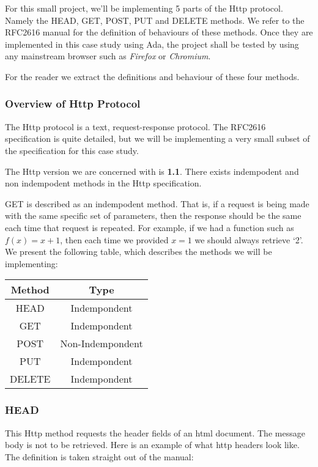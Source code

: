 For this small project, we'll be implementing 5 parts of the Http protocol. 
Namely the HEAD, GET, POST, PUT and DELETE methods. We refer to the RFC2616 manual \cite{RFC2616}
for the definition of behaviours of these methods. Once they are implemented in
this case study using Ada, the project shall be tested by using any mainstream 
browser such as \textit{Firefox} or \textit{Chromium}.

For the reader we extract the definitions and behaviour of these four methods.
\subsubsection{Overview of Http Protocol}
The Http protocol is a text, request-response protocol. The RFC2616 specification is quite detailed, but we will be implementing a very small subset of the specification for this case study.

The Http version we are concerned with is \textbf{1.1}. There exists indempodent and non indempodent methods in the Http specification. 

GET is described as an indempodent method. That is, if a request is being made with the same specific set of parameters, then the response should be the same each time that request is repeated. For example, if we had a function such as $ f(x) = x + 1 $, then each time we provided $ x = 1 $ we should always retrieve `2'. We present the following table, which describes the methods we will be implementing:
\\
\begin{center}
\begin{tabular}{| c | c |}
\hline
\textbf{Method} & \textbf{Type} \\ \hline \hline
HEAD   & Indempondent \\
GET    & Indempondent \\
POST   & Non-Indempondent \\
PUT    & Indempondent \\ 
DELETE & Indempondent \\
\hline
\end{tabular}
\end{center}
\subsubsection{HEAD}
This Http method requests the header fields of an html document. The message body is not to be retrieved. Here is an example of what http headers look like. The definition is taken straight out of the manual:  


